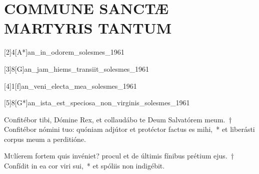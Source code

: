 \documentclass[vesperale_romanum.tex]{subfiles}
\begin{document}
\section[Commune non Virginum]{COMMUNE SANCTÆ MARTYRIS TANTUM}
\subtitle{et nec Virginis nec Martyris.}



[2]{4}[A*]{an_in_odorem_solesmes_1961}

[3]{8}[G]{an_jam_hiems_transiit_solesmes_1961}

[4]{1}[f]{an_veni_electa_mea_solesmes_1961}

[5]{8}[G*]{an_ista_est_speciosa_non_virginis_solesmes_1961}



\lettrine{C}{o}nfitébor tibi, Dómine Rex, et collaudábo te Deum Salvatórem meum.~† Confitébor nómini tuo: quóniam adjútor et proté\-ctor fa\-ctus es mihi,~* et liberásti corpus meum a perditióne.


\lettrine{M}{u}líerem fortem quis invéniet? procul et de últimis fínibus prétium ejus.~† Confídit in ea cor viri sui,~* et spóliis non indigébit.






\end{document}
